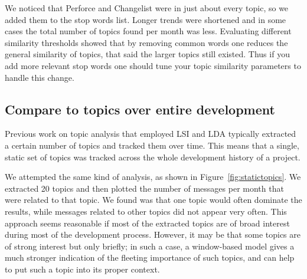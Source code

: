 \documentclass[times, 10pt,twocolumn]{article}
\begin{document}
We noticed that Perforce and Changelist were in just about every
topic, so we added them to the stop words list. Longer trends were
shortened and in some cases the total number of topics found per month
was less. Evaluating different similarity thresholds showed that by
removing common words one reduces the general similarity of topics,
that said the larger topics still existed. Thus if you add more
relevant stop words one should tune your topic similarity parameters
to handle this change.




\subsection{Compare to topics over entire development}





Previous work on topic analysis that employed LSI and LDA typically
extracted a certain number of topics and tracked them over time. This
means that a single, static set of topics was tracked across the whole
development history of a project. 

We attempted the same kind of analysis, as shown in
Figure~\ref{fig:statictopics}. We extracted 20 topics and then plotted
the number of messages per month that were related to that topic. We
found was that one topic would often dominate the results, while
messages related to other topics did not appear very often.
This approach seems reasonable if most of the extracted topics are of
broad interest during most of the development process.  However, it
may be that some topics are of strong interest but only briefly; in
such a case, a window-based model gives a much stronger indication of
the fleeting importance of such topics, and can help to put such a
topic into its proper context.
\end{document}
